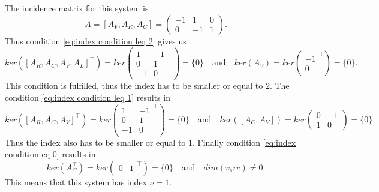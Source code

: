 	The incidence matrix for this system is
	\begin{displaymath}
		A = [A_V, A_R, A_C] = 
		\left(
		\begin{matrix}
			-1 & 1 & 0 \\
			0 & -1 & 1 
		\end{matrix}
		\right).
	\end{displaymath} 
	Thus condition \eqref{eq:index condition leq 2} gives us
	\begin{displaymath}
		ker([A_R, A_C, A_V, A_L]^\top) = ker
		\left(
		\begin{matrix}
			1 & -1 \\
			0 & 1 \\
			-1 & 0
		\end{matrix}^\top
		\right) 
		 = \{0\} 
		\quad \text{and} \quad 
		ker(A_V) = ker
		\left(
		\begin{matrix}
			-1 \\
			0
		\end{matrix}^\top
		\right) = \{0\}.
	\end{displaymath}
	This condition is fulfilled, thus the index has to be smaller or equal to $2$.
	The condition \eqref{eq:index condition leq 1} results in
	\begin{displaymath}
		ker([A_R, A_C, A_V]^\top) = ker
		\left(
		\begin{matrix}
			1 & -1 \\
			0 & 1 \\
			-1 & 0
		\end{matrix}^\top
		\right) 
		= \{0\} 
		\quad \text{and} \quad
		ker([A_C, A_V]) = ker
		\left(
		\begin{matrix}
			0 & -1\\
			1 & 0
		\end{matrix}
		\right) = \{0\}.
	\end{displaymath}
	Thus the index also has to be smaller or equal to $1$. 
	Finally condition \eqref{eq:index condition eq 0} results in
	\begin{displaymath}
		ker(A_C^\top) = ker
		\left(
		\begin{matrix}
			0 & 1
		\end{matrix}^\top
		\right) 
		= \{0\} 
		\quad \text{and} \quad
		dim(v_src) \neq 0.
	\end{displaymath}
	This means that this system has index $\nu = 1$.
	
